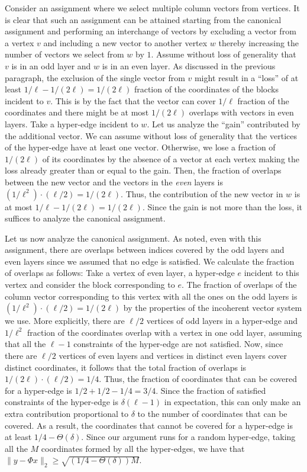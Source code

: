 \documentclass[11pt]{article}
\begin{document}
\begin{itemize}
Consider an assignment where we select multiple column vectors
from vertices. It is clear that such an assignment can be attained
starting from the canonical assignment and performing an interchange of
vectors by excluding a vector from a vertex $v$ and including a new vector
to another vertex $w$ thereby increasing the number of vectors we
select from $w$ by $1$. Assume
without loss of generality that $v$ is in an odd layer and
$w$ is in an even layer. As discussed in the previous
paragraph, the exclusion of the single vector from $v$ might result in a ``loss''
of at least $1/\ell-1/(2\ell) = 1/(2\ell)$ fraction of the coordinates of
the blocks incident to $v$. This is by the fact that the vector can cover
$1/\ell$ fraction of the coordinates and there might be at most $1/(2\ell)$
overlaps with vectors in even layers. Take a hyper-edge incident to $w$.
Let us analyze the ``gain'' contributed by the additional vector. We
can assume without loss of generality that the vertices of the hyper-edge
have at least one vector. Otherwise, we lose a fraction of $1/(2\ell)$
of its coordinates by the absence of a vector at each vertex making
the loss already greater than or equal to the gain. Then,
the fraction of overlaps between the new vector and the vectors in
the \emph{even} layers is $(1/\ell^2) \cdot (\ell/2) = 1/(2\ell)$. Thus,
the contribution of the new vector in $w$ is at most $1/\ell - 1/(2\ell)
= 1/(2\ell)$. Since the gain is not more than the loss, it
suffices to analyze the canonical assignment.

Let us now analyze the canonical assignment.
As noted, even with this assignment, there are overlaps
between indices covered by the odd layers and even layers since we
assumed that no edge is satisfied. We calculate the fraction of
overlaps as follows: Take a vertex of even layer, a hyper-edge $e$ incident
to this vertex and consider the block corresponding to $e$. The fraction of
overlaps of the column vector corresponding to this vertex with all
the ones on the odd layers is $(1/\ell^2) \cdot (\ell/2) =
1/(2\ell)$ by the properties of the incoherent vector system we use.
More explicitly, there are $\ell/2$ vertices of odd layers in a
hyper-edge and $1/\ell^2$ fraction of the coordinates overlap
with a vertex in one odd layer, assuming that all the $\ell-1$
constraints of the hyper-edge are not satisfied. Now, since there are
$\ell/2$ vertices of even layers and vertices in distinct even layers
cover distinct coordinates, it follows that the total
fraction of overlaps is $1/(2\ell) \cdot (\ell/2) = 1/4$. Thus,
the fraction of coordinates that can be covered for a hyper-edge
is $1/2+1/2- 1/4 = 3/4$. Since the fraction of satisfied constraints
of the hyper-edge is $\delta(\ell-1)$ in expectation, this can
only make an extra contribution proportional to $\delta$ to the number
of coordinates that can be covered. As a result, the coordinates
that cannot be covered for a hyper-edge is at least
$1/4-\Theta(\delta)$. Since our argument runs for a random hyper-edge,
taking all the $M$ coordinates formed by all the hyper-edges,
we have that $\|y - \Phi x\|_2 \geq \sqrt{(1/4-\Theta(\delta)) M}$.
\end{itemize}
\end{document}
